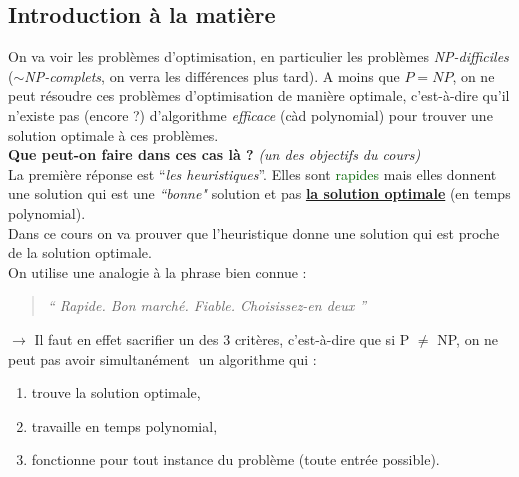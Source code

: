 \documentclass{article}
\newcommand{\gre}[1]{\textcolor{darkgreen}{#1}}
\newcommand{\quotecolor}[1]{\textcolor{quote}{#1}}
\begin{document}
\begin{sffamily}
\subsection{Introduction à la matière}

On va voir les problèmes d'optimisation, en particulier les problèmes \textit{NP-difficiles} ($\sim$\textit{NP-complets}, on verra 
les différences plus tard). A moins que $P = NP$, on ne peut résoudre ces problèmes d'optimisation de manière optimale,
c'est-à-dire qu'il n'existe pas (encore ?) d'algorithme \textit{efficace} (càd polynomial) pour trouver une solution optimale à 
ces problèmes. \\

\textbf{Que peut-on faire dans ces cas là ?}\textit{ (un des objectifs du cours)} \\

\noindent La première réponse est ``\textit{les heuristiques}''. Elles sont \gre{rapides} mais elles donnent une solution qui est 
une \textit{``bonne"} solution et pas \textbf{\underline{la solution optimale}} (en temps polynomial).\\ Dans ce cours on va 
prouver que l'heuristique donne une solution qui est proche de la solution optimale. \\

\noindent On utilise une analogie à la phrase bien connue : 
\begin{quote}\begin{center}
\textit{\quotecolor{{\Huge ``}}
Rapide. Bon marché. Fiable. Choisissez-en deux
\quotecolor{{\Huge ''}}}
\end{center}\end{quote}
$\longrightarrow$ Il faut en effet sacrifier un des 3 critères, c'est-à-dire que si P $\neq$ NP, on ne peut pas avoir simultanément 
\indent $ $ un algorithme qui :
\begin{enumerate}
\item trouve la solution optimale,
\item travaille en temps polynomial,
\item fonctionne pour tout instance du problème (toute entrée possible). \\
\end{enumerate} 


\end{sffamily}
\end{document}
